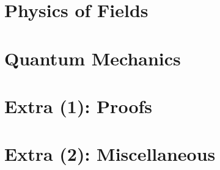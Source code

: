 \chapter{Physics of Fields}




% 
% 
% 
% 


\chapter{Quantum Mechanics}




% 
% 


\chapter{Extra (1): Proofs}




\chapter{Extra (2): Miscellaneous}








\backmatter
\renewcommand{\emph}[1]{\textit{#1}}
\printbibliography


